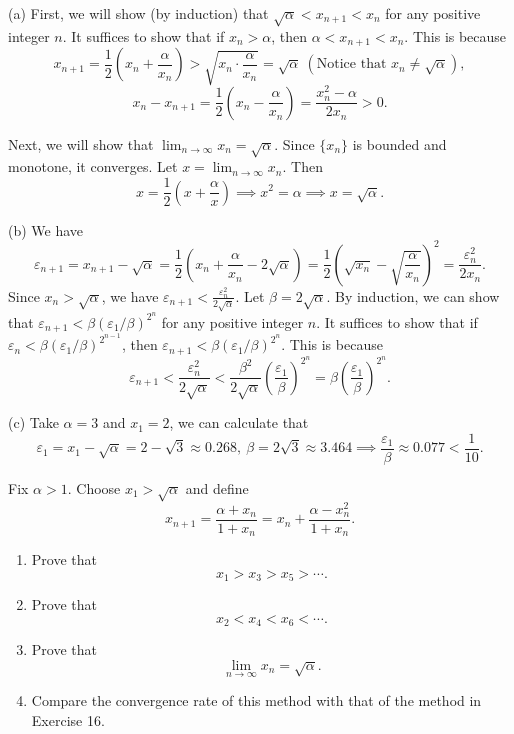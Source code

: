\documentclass{article}
\begin{document}
\begin{solution}
    (a) First, we will show (by induction) that \( \sqrt{\alpha}<x_{n+1}<x_n \) for any positive integer \( n \). It suffices to show that if \( x_n>\alpha \), then \( \alpha<x_{n+1}<x_{n} \). This is because
    \[ x_{n+1}=\frac{1}{2}\left(x_n+\frac{\alpha}{x_n}\right)>\sqrt{x_{n}\cdot\frac{\alpha}{x_n}}=\sqrt{\alpha}\ (\text{Notice that } x_n \neq \sqrt{\alpha}), \] 
    \[ x_{n}-x_{n+1}=\frac{1}{2}\left(x_n-\frac{\alpha}{x_n}\right)=\frac{x_{n}^2-\alpha}{2x_n}>0 . \]\par
    Next, we will show that \( \lim_{n\to\infty} x_n=\sqrt{\alpha} \). Since \( \{x_n\} \) is bounded and monotone, it converges. Let \( x=\lim_{n\to\infty} x_n \). Then
    \[ x=\frac{1}{2}\left(x+\frac{\alpha}{x}\right) \implies x^2=\alpha\implies x=\sqrt{\alpha}. \]\par
	(b) We have
	\[ \varepsilon_{n+1}=x_{n+1}-\sqrt{\alpha}=\frac{1}{2}\left(x_n+\frac{\alpha}{x_n}-2\sqrt{\alpha}\right)=\frac{1}{2}\left(\sqrt{x_n}-\sqrt{\frac{\alpha}{x_n}}\right)^2=\frac{\varepsilon_n^2}{2x_n}. \]
	Since \( x_n>\sqrt{\alpha} \), we have \( \varepsilon_{n+1}<\frac{\varepsilon_n^2}{2\sqrt{\alpha}} \). Let \( \beta=2\sqrt{\alpha} \).
	By induction, we can show that \( \varepsilon_{n+1}<\beta\left(\varepsilon_1/\beta\right)^{2^n} \) for any positive integer \( n \). It suffices to show that if \( \varepsilon_n<\beta\left(\varepsilon_1/\beta\right)^{2^{n-1}} \), then \( \varepsilon_{n+1}<\beta\left(\varepsilon_1/\beta\right)^{2^n} \). This is because
	\[ \varepsilon_{n+1}<\frac{\varepsilon_n^2}{2\sqrt{\alpha}}<\frac{\beta^2}{2\sqrt{\alpha}}\left(\frac{\varepsilon_1}{\beta}\right)^{2^n}=\beta\left(\frac{\varepsilon_1}{\beta}\right)^{2^n}. \]\par
	(c) Take \( \alpha=3 \) and \( x_1=2 \), we can calculate that
	\[ \varepsilon_1=x_1-\sqrt{\alpha}=2-\sqrt{3}\approx 0.268,\ \beta=2\sqrt{3}\approx 3.464\implies \frac{\varepsilon_1}{\beta}\approx 0.077<\frac{1}{10}. \] 
\end{solution}

\begin{problem}[3-17]
Fix $\alpha>1$. Choose $x_1>\sqrt{\alpha}$ and define
\[
x_{n+1}=\frac{\alpha+x_n}{1+x_n}
=x_n+\frac{\alpha-x_n^2}{1+x_n}.
\]

\begin{enumerate}
	\item[(a)] Prove that
	\[
	x_1>x_3>x_5>\cdots.
	\]

	\item[(b)] Prove that
	\[
	x_2<x_4<x_6<\cdots.
	\]

	\item[(c)] Prove that
	\[
	\lim_{n\to\infty}x_n=\sqrt{\alpha}.
	\]

	\item[(d)] Compare the convergence rate of this method with that of the method in Exercise 16.
\end{enumerate}
\end{problem}
\end{document}
